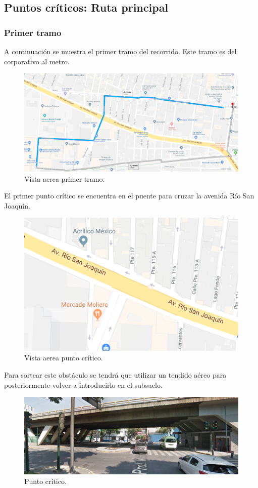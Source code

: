 \documentclass[12pt,letterpaper]{article}
\begin{document}
\newpage
\subsection{Puntos críticos: Ruta principal}
\subsubsection{Primer tramo}
A continuación se muestra el primer tramo del recorrido. Este 
tramo es del corporativo al metro.
\begin{figure}[ht]
    \centering
    \includegraphics[width=.8\textwidth]{f5.png}
    \caption{Vista aerea primer tramo.}
\end{figure}

El primer punto crítico se encuentra en el puente para cruzar la 
avenida Río San Joaquín.
\begin{figure}[ht]
    \centering
    \includegraphics[width=.6\textwidth]{f4.png}
    \caption{Vista aerea punto crítico.}
\end{figure}

Para sortear este obstáculo se tendrá que utilizar un tendido aéreo 
para posteriormente volver a introducirlo en el subsuelo.
\begin{figure}[ht]
    \centering
    \includegraphics[width=1\textwidth]{f6.png}
    \caption{Punto crítico.}
\end{figure}
\end{document}
